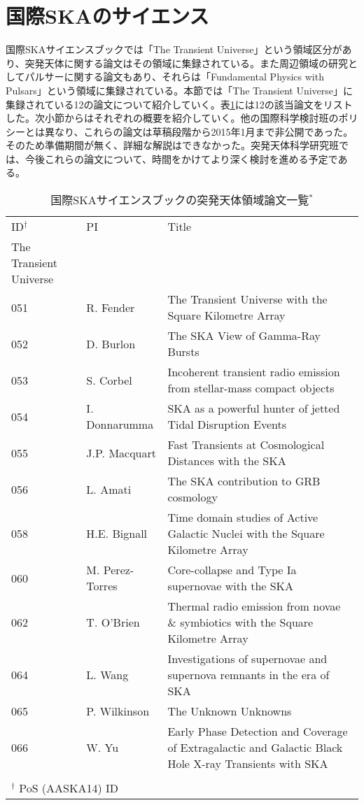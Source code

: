 \section{国際SKAのサイエンス}\label{transients.s2}
国際SKAサイエンスブックでは「The Transient Universe」という領域区分があり、突発天体に関する論文はその領域に集録されている。また周辺領域の研究としてパルサーに関する論文もあり、それらは「Fundamental Physics with Pulsars」という領域に集録されている。本節では「The Transient Universe」に集録されている12の論文について紹介していく。表\ref{c09.s2.t1}には12の該当論文をリストした。次小節からはそれぞれの概要を紹介していく。他の国際科学検討班のポリシーとは異なり、これらの論文は草稿段階から2015年1月まで非公開であった。そのため準備期間が無く、詳細な解説はできなかった。突発天体科学研究班では、今後これらの論文について、時間をかけてより深く検討を進める予定である。

\begin{table}[htbp]
\begin{center}
\caption{国際SKAサイエンスブックの突発天体領域論文一覧$^*$}
\small
\begin{tabular}{llp{}}
\hline\hline
\noalign{\smallskip}
ID$^\dag$ & PI & Title\\
\noalign{\smallskip}
\hline
\noalign{\smallskip}
The Transient Universe &&\\
051 & R. Fender & The Transient Universe with the Square Kilometre Array \\
052 & D. Burlon & The SKA View of Gamma-Ray Bursts \\
053 & S. Corbel & Incoherent transient radio emission from stellar-mass compact objects \\
054 & I. Donnarumma & SKA as a powerful hunter of jetted Tidal Disruption Events \\
055 & J.P. Macquart & Fast Transients at Cosmological Distances with the SKA \\
056 & L. Amati & The SKA contribution to GRB cosmology \\
058 & H.E. Bignall & Time domain studies of Active Galactic Nuclei with the Square Kilometre Array \\
060 & M. Perez-Torres & Core-collapse and Type Ia supernovae with the SKA \\
062 & T. O'Brien & Thermal radio emission from novae \& symbiotics with the Square Kilometre Array \\
064 & L. Wang & Investigations of supernovae and supernova remnants in the era of SKA \\
065 & P. Wilkinson & The Unknown Unknowns \\
066 & W. Yu & Early Phase Detection and Coverage of Extragalactic and Galactic Black Hole X-ray Transients with SKA \\
\noalign{\smallskip}
\hline
\noalign{\smallskip}
\multicolumn{2}{l}{\small $^{*}$ArXiv未投稿含む} & \\
\multicolumn{2}{l}{\small $^\dag$ PoS (AASKA14) ID} & \\
\end{tabular}\label{c09.s2.t1}
\end{center}
\end{table}



